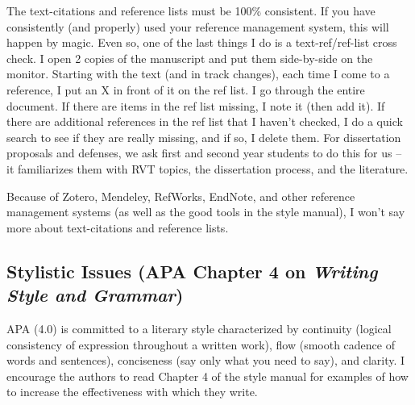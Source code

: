 \documentclass[
  11pt,
]{book}
\begin{document}
The text-citations and reference lists must be 100\% consistent. If you have consistently (and properly) used your reference management system, this will happen by magic. Even so, one of the last things I do is a text-ref/ref-list cross check. I open 2 copies of the manuscript and put them side-by-side on the monitor. Starting with the text (and in track changes), each time I come to a reference, I put an X in front of it on the ref list. I go through the entire document. If there are items in the ref list missing, I note it (then add it). If there are additional references in the ref list that I haven't checked, I do a quick search to see if they are really missing, and if so, I delete them. For dissertation proposals and defenses, we ask first and second year students to do this for us -- it familiarizes them with RVT topics, the dissertation process, and the literature.

Because of Zotero, Mendeley, RefWorks, EndNote, and other reference management systems (as well as the good tools in the style manual), I won't say more about text-citations and reference lists.

\hypertarget{stylistic-issues-apa-chapter-4-on-writing-style-and-grammar}{%
\subsection{\texorpdfstring{Stylistic Issues (APA Chapter 4 on \emph{Writing Style and Grammar})}{Stylistic Issues (APA Chapter 4 on Writing Style and Grammar)}}\label{stylistic-issues-apa-chapter-4-on-writing-style-and-grammar}}

APA (4.0) is committed to a literary style characterized by continuity (logical consistency of expression throughout a written work), flow (smooth cadence of words and sentences), conciseness (say only what you need to say), and clarity. I encourage the authors to read Chapter 4 of the style manual for examples of how to increase the effectiveness with which they write.
\end{document}
